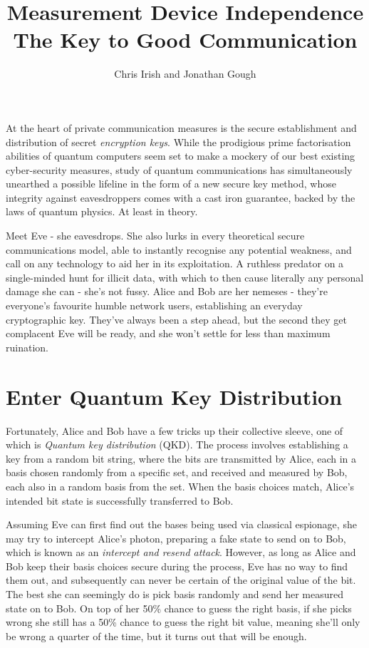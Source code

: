 \documentclass[journal]{vgtc}
\title{Measurement Device Independence \\ The Key to Good Communication }
\author{Chris Irish and Jonathan Gough}
\begin{document}

\maketitle

At the heart of private communication measures is the secure establishment and distribution of secret \textit{encryption keys}. While the prodigious prime factorisation abilities of quantum computers seem set to make a mockery of our best existing cyber-security measures,
study of quantum communications has simultaneously unearthed a possible lifeline in the form of a new secure key method, whose integrity against eavesdroppers comes with a cast iron guarantee, backed by the laws of quantum physics. At least in theory.

\noindent Meet Eve - she eavesdrops. She also lurks in every theoretical secure communications model, able to instantly recognise any potential weakness, and call on any technology to aid her in its exploitation. A ruthless predator on a single-minded hunt for illicit data, with which to then cause literally any personal damage she can - she's not fussy. Alice and Bob are her nemeses - they're everyone's favourite humble network users, establishing an everyday cryptographic key. They've always been a step ahead, but the second they get complacent Eve will be ready, and she won't settle for less than maximum ruination.



\section{Enter Quantum Key Distribution}

Fortunately, Alice and Bob have a few tricks up their collective sleeve, one of which is \textit{Quantum key distribution} (QKD). The process involves establishing a key from a random bit string, where the bits are transmitted by Alice, each in a basis chosen randomly from a specific set, and received and measured by Bob, each also in a random basis from the set. When the basis choices match, Alice's intended bit state is successfully transferred to Bob.

\noindent Assuming Eve can first find out the bases being used via classical espionage, she may try to intercept Alice's photon, preparing a fake state to send on to Bob, which is known as an \textit{intercept and resend attack}. However, as long as Alice and Bob keep their basis choices secure during the process, Eve has no way to find them out, and subsequently can never be certain of the original value of the bit. The best she can seemingly do is pick basis randomly and send her measured state on to Bob. On top of her 50\% chance to guess the right basis, if she picks wrong she still has a 50\% chance to guess the right bit value, meaning she'll only be wrong a quarter of the time, but it turns out that will be enough.
\end{document}
